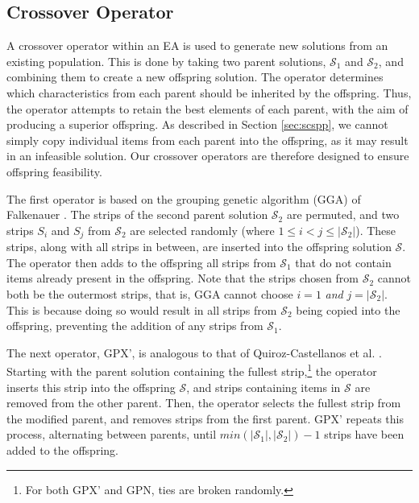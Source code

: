\documentclass{elsarticle}
\begin{document}
\subsection{Crossover Operator}
\label{sub:xover}
A crossover operator within an EA is used to generate new solutions from an existing population. This is done by taking two parent solutions, $\mathcal{S}_1$ and $\mathcal{S}_2$, and combining them to create a new offspring solution. The operator determines which characteristics from each parent should be inherited by the offspring. Thus, the operator attempts to retain the best elements of each parent, with the aim of producing a superior offspring. As described in Section \ref{sec:scspp}, we cannot simply copy individual items from each parent into the offspring, as it may result in an infeasible solution. Our crossover operators are therefore designed to ensure offspring feasibility.

The first operator is based on the grouping genetic algorithm (GGA) of Falkenauer \cite{falkenauer1992}. The strips of the second parent solution $\mathcal{S}_2$ are permuted, and two strips $S_i$ and $S_j$ from $\mathcal{S}_2$ are selected randomly (where $1 \leq i < j \leq |\mathcal{S}_2|$). These strips, along with all strips in between, are inserted into the offspring solution $\mathcal{S}$. The operator then adds to the offspring all strips from $\mathcal{S}_1$ that do not contain items already present in the offspring. Note that the strips chosen from $\mathcal{S}_2$ cannot both be the outermost strips, that is, GGA cannot choose $i = 1$ \emph{and} $j = |\mathcal{S}_2|$. This is because doing so would result in all strips from $\mathcal{S}_2$ being copied into the offspring, preventing the addition of any strips from $\mathcal{S}_1$.


The next operator, \alert{GPX'}, is analogous to that of Quiroz-Castellanos et al. \cite{quiroz2015}. Starting with the parent solution containing the fullest strip,\footnote{For both \alert{GPX'} and \alert{GPN}, ties are broken randomly.} the operator inserts this strip into the offspring $\mathcal{S}$, and strips containing items in $\mathcal{S}$ are removed from the other parent. Then, the operator selects the fullest strip from the modified parent, and removes strips from the first parent. GPX' repeats this process, alternating between parents, until $min (|\mathcal{S}_1|,|\mathcal{S}_2|) - 1$ strips have been added to the offspring.
\end{document}
